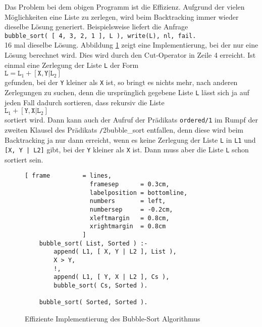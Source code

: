Das Problem bei dem obigen Programm ist die Effizienz.  Aufgrund der vielen M\"{o}glichkeiten
eine Liste zu zerlegen, wird beim Backtracking immer wieder dieselbe L\"{o}sung generiert. 
Beispielsweise liefert die Anfrage \\[0.1cm]
\hspace*{1.3cm} \texttt{bubble\_sort( [ 4, 3, 2, 1 ], L ), write(L), nl, fail.} \\[0.1cm]
16 mal dieselbe L\"{o}sung.  Abbildung \ref{fig:bubble_sort_cut} zeigt eine Implementierung,
bei der nur eine L\"{o}sung berechnet wird.  Dies wird durch den Cut-Operator in Zeile 4
erreicht.   Ist einmal eine Zerlegung der Liste \texttt{L} der Form
\\[0.2cm]
\hspace*{1.3cm}
$\mathtt{L} = \texttt{L}_1 +[ \texttt{X}, \mathtt{Y} | \mathtt{L}_2]$
\\[0.2cm] 
gefunden, bei der \texttt{Y} kleiner als \texttt{X} ist, so bringt es
nichts mehr, nach anderen Zerlegungen zu suchen, denn die urspr\"{u}nglich gegebene Liste
\texttt{L} l\"{a}sst sich ja auf jeden Fall dadurch sortieren, dass rekursiv die Liste 
\\[0.2cm]
\hspace*{1.3cm}
 $\mathtt{L}_1 + [\mathtt{Y},\mathtt{X}|\mathtt{L}_2]$ 
\\[0.1cm]
sortiert wird.  Dann kann auch der Aufruf der Pr\"{a}dikats \texttt{ordered/1} im Rumpf der zweiten
Klausel des Pr\"{a}dikats \texttt/2{bubble\_sort} entfallen, denn diese wird beim Backtracking
ja nur dann erreicht, wenn es keine Zerlegung der Liste \texttt{L} in  \texttt{L1} und 
\texttt{[X, Y | L2]} gibt, bei der \texttt{Y} kleiner als \texttt{X} ist.  Dann muss aber
die Liste \texttt{L} schon sortiert sein.

\begin{figure}[!h]
  \centering
\begin{Verbatim}[ frame         = lines, 
                  framesep      = 0.3cm, 
                  labelposition = bottomline,
                  numbers       = left,
                  numbersep     = -0.2cm,
                  xleftmargin   = 0.8cm,
                  xrightmargin  = 0.8cm
                ]
    bubble_sort( List, Sorted ) :-
        append( L1, [ X, Y | L2 ], List ),
        X > Y,
        !,
        append( L1, [ Y, X | L2 ], Cs ),
        bubble_sort( Cs, Sorted ).
    
    bubble_sort( Sorted, Sorted ).
\end{Verbatim}
\vspace*{-0.3cm}
  \caption{Effiziente Implementierung des  Bubble-Sort Algorithmus}
  \label{fig:bubble_sort_cut}
\end{figure}

